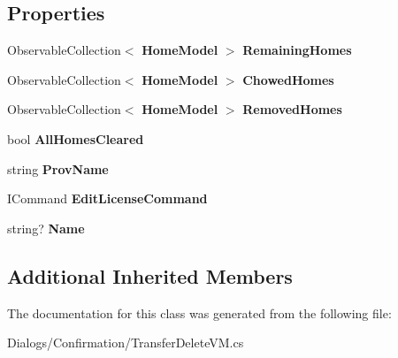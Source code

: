 \subsection*{Properties}
\begin{DoxyCompactItemize}
\item 
\mbox{\label{class_a_f_h___scheduler_1_1_dialogs_1_1_confirmation_1_1_transfer_delete_v_m_a45332b22a778f90f41dc5b3dddc72e6b}} 
Observable\+Collection$<$ \textbf{ Home\+Model} $>$ {\bfseries Remaining\+Homes}\hspace{0.3cm}{\ttfamily  [get, set]}
\item 
\mbox{\label{class_a_f_h___scheduler_1_1_dialogs_1_1_confirmation_1_1_transfer_delete_v_m_a1b33d94b4bf06b21ac1762aca32cf4e6}} 
Observable\+Collection$<$ \textbf{ Home\+Model} $>$ {\bfseries Chowed\+Homes}\hspace{0.3cm}{\ttfamily  [get, set]}
\item 
\mbox{\label{class_a_f_h___scheduler_1_1_dialogs_1_1_confirmation_1_1_transfer_delete_v_m_a90ea7f6581d237f1c337d8f2dadfce72}} 
Observable\+Collection$<$ \textbf{ Home\+Model} $>$ {\bfseries Removed\+Homes}\hspace{0.3cm}{\ttfamily  [get, set]}
\item 
\mbox{\label{class_a_f_h___scheduler_1_1_dialogs_1_1_confirmation_1_1_transfer_delete_v_m_a5245803c49628f0e82cdf19bb3915431}} 
bool {\bfseries All\+Homes\+Cleared}\hspace{0.3cm}{\ttfamily  [get, set]}
\item 
\mbox{\label{class_a_f_h___scheduler_1_1_dialogs_1_1_confirmation_1_1_transfer_delete_v_m_a4c83265ece08db849a7aa5924188efcb}} 
string {\bfseries Prov\+Name}\hspace{0.3cm}{\ttfamily  [get, set]}
\item 
\mbox{\label{class_a_f_h___scheduler_1_1_dialogs_1_1_confirmation_1_1_transfer_delete_v_m_a7b140a939ef8f40b79c3edbed01eb763}} 
I\+Command {\bfseries Edit\+License\+Command}\hspace{0.3cm}{\ttfamily  [get]}
\item 
\mbox{\label{class_a_f_h___scheduler_1_1_dialogs_1_1_confirmation_1_1_transfer_delete_v_m_a34ef29827b09c3a0dacfd72d29d1759c}} 
string? {\bfseries Name}\hspace{0.3cm}{\ttfamily  [get]}
\end{DoxyCompactItemize}
\subsection*{Additional Inherited Members}


The documentation for this class was generated from the following file\+:\begin{DoxyCompactItemize}
\item 
Dialogs/\+Confirmation/Transfer\+Delete\+V\+M.\+cs\end{DoxyCompactItemize}
